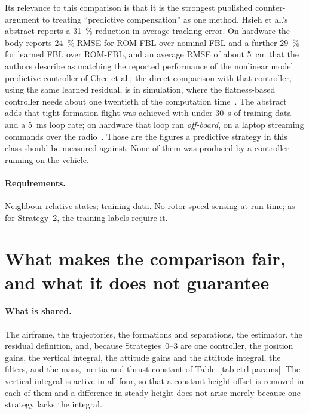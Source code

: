 Its relevance to this comparison is that it is the strongest published counter-argument to treating
``predictive compensation'' as one method. Hsieh et al.'s abstract reports a \SI{31}{\percent}
reduction in average tracking error. On hardware the body reports \SI{24}{\percent} RMSE for
ROM-FBL over nominal FBL and a further \SI{29}{\percent} for learned FBL over ROM-FBL, and an
average RMSE of about \SI{5}{\centi\metre} that the authors describe as matching the reported
performance of the nonlinear model predictive controller of Chee et al.; the direct comparison with
that controller, using the same learned residual, is in simulation, where the flatness-based
controller needs about one twentieth of the computation time~\cite{hsieh2026flatness}. The abstract
adds that tight formation flight was achieved with under \SI{30}{\second} of training data and a
\SI{5}{\milli\second} loop rate; on hardware that loop ran \emph{off-board}, on a laptop streaming
commands over the radio~\cite{hsieh2026flatness}.
Those are the figures a predictive strategy in this class should be measured against. None of them
was produced by a controller running on the vehicle.

\paragraph{Requirements.} Neighbour relative states; training data. No rotor-speed sensing at run
time; as for Strategy~2, the training labels require it.

\section{What makes the comparison fair, and what it does not guarantee}
\label{sec:ctrl-fairness}

\paragraph{What is shared.} The airframe, the trajectories, the formations and separations, the
estimator, the residual definition, and, because Strategies~0--3 are one controller, the position
gains, the vertical integral, the attitude gains and the attitude integral, the filters, and the
mass, inertia and thrust constant of Table~\ref{tab:ctrl-params}. The vertical integral is active in
all four, so that a constant height offset is removed in each of them and a difference in steady
height does not arise merely because one strategy lacks the integral.

